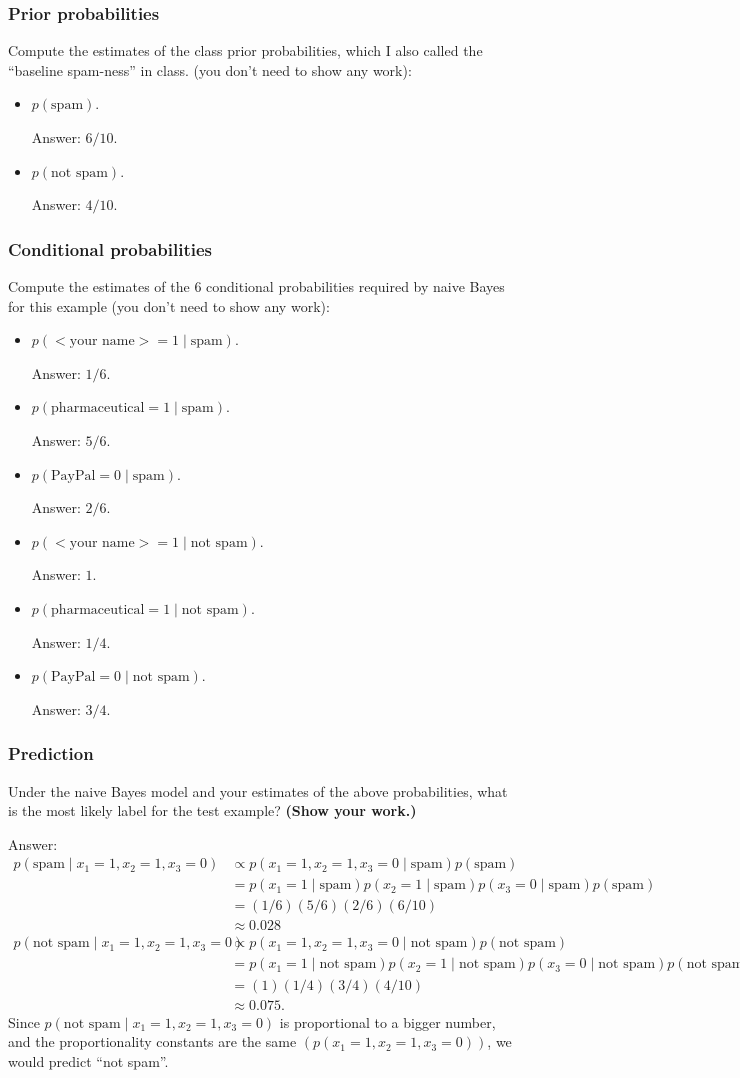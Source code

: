 \documentclass{article}
\def\ans#1{\par\gre{Answer: #1}}
\def\blu#1{{\color{blu}#1}}
\def\gre#1{{\color{gre}#1}}
\def\cond{\; | \;}
\def\items#1{\begin{itemize}#1\end{itemize}}
\begin{document}
	\subsubsection{Prior probabilities}
	\blu{Compute the estimates of the class prior probabilities, which I also called the ``baseline spam-ness'' in class.} (you don't need to show any work):
	\items{
		\item$ p(\text{spam})$.
		\ans{$6/10$.}
		\item $p(\text{not spam})$.
		\ans{$4/10$.}
	}
	
	\subsubsection{Conditional probabilities}
	
	\blu{Compute the estimates of the 6 conditional probabilities required by naive Bayes for this example}  (you don't need to show any work):
	\items{
		\item $p(\text{$<$your name$>$} = 1  \cond \text{spam})$.
		\ans{$1/6$.}
		\item $p(\text{pharmaceutical} = 1 \cond \text{spam})$.
		\ans{$5/6$.}
		\item $p(\text{PayPal} = 0  \cond \text{spam})$.
		\ans{$2/6$.}
		\item $p(\text{$<$your name$>$} = 1  \cond \text{not spam})$.
		\ans{$1$.}
		\item $p(\text{pharmaceutical} = 1  \cond \text{not spam})$.
		\ans{$1/4$.}
		\item $p(\text{PayPal} = 0  \cond \text{not spam})$.
		\ans{$3/4$.}
	}
	
	\subsubsection{Prediction}
	
	
	\blu{Under the naive Bayes model and your estimates of the above probabilities, what is the most likely label for the test example? \textbf{(Show your work.)}}
	\ans
	{
		\begin{align*}
			p(\text{spam} \cond x_1 = 1, x_2 = 1, x_3 = 0) & \propto p( x_1 = 1, x_2 = 1, x_3 = 0 \cond \text{spam})p(\text{spam}) \\
			& = p(x_1 = 1\cond \text{spam})p(x_2 = 1 \cond \text{spam})p(x_3 = 0 \cond \text{spam})p(\text{spam})\\
			& = (1/6)(5/6)(2/6)(6/10)\\
			& \approx 0.028
		\end{align*}
		\begin{align*}
			p(\text{not spam} \cond  x_1 = 1, x_2 = 1, x_3 = 0) & \propto p( x_1 = 1, x_2 = 1, x_3 = 0 \cond \text{not spam})p(\text{not spam}) \\
			& = p(x_1 = 1 \cond \text{not spam})p(x_2 = 1 \cond \text{not spam})p(x_3 = 0 \cond \text{not spam})p(\text{not spam})\\
			& = (1)(1/4)(3/4)(4/10)\\
			& \approx 0.075.
		\end{align*}
		Since $p(\text{not spam} \cond  x_1 = 1, x_2 = 1, x_3 = 0)$ is proportional to a bigger number, and the proportionality constants are the same $(p(x_1=1,x_2=1,x_3=0))$, we would predict ``not spam''.
	}
	
\end{document}
